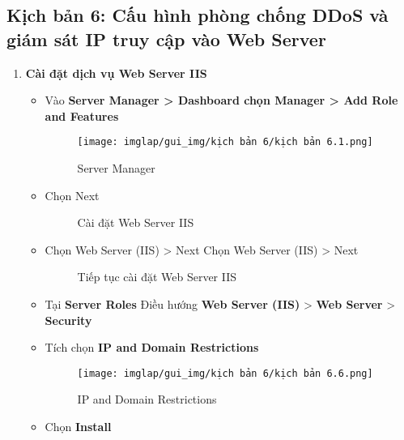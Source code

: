 \documentclass[13pt]{article}
\begin{document}
        \subsection{Kịch bản 6: Cấu hình phòng chống DDoS và giám sát IP truy cập vào Web Server}
        \begin{enumerate}
            \item \textbf{Cài đặt dịch vụ Web Server IIS } 
\begin{itemize}
\item Vào \textbf{Server Manager > Dashboard chọn Manager > Add Role and Features} 
\begin{figure}[H]
            \centering
            \texttt{[image: imglap/gui\_img/kịch bản 6/kịch bản 6.1.png]}
            \caption{Server Manager}
            \label{fig:enter-label}
        \end{figure}
        \item Chọn Next 
\begin{figure}[H]
 		\hfill
 		\hfill
 				\caption{Cài đặt Web Server IIS}
 				\label{fig:AD_p2}
 		\end{figure}
\newpage
        \item Chọn Web Server (IIS) > Next 
Chọn Web Server (IIS) > Next\begin{figure}[H]
 		\hfill
 		\hfill
 				\caption{Tiếp tục cài đặt Web Server IIS}
 				\label{fig:AD_p2}
 		\end{figure}
        \item Tại \textbf{Server Roles} Điều hướng \textbf{Web Server (IIS)} > \textbf{Web Server} > \textbf{Security }
        \item Tích chọn \textbf{IP and Domain Restrictions} 
\begin{figure}[H]
    \centering
    \texttt{[image: imglap/gui\_img/kịch bản 6/kịch bản 6.6.png]}
    \caption{IP and Domain Restrictions}
    \label{fig:enter-label}
\end{figure}
\newpage
\item  Chọn \textbf{Install} 
\begin{figure}[H]

\end{figure}
\end{itemize}
\end{enumerate}
\end{document}
